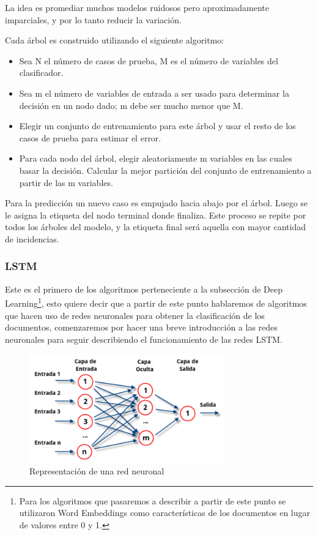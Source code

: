 La idea es promediar muchos modelos ruidosos pero aproximadamente imparciales, y por lo tanto reducir la variación.

Cada árbol es construido utilizando el siguiente algoritmo:
\begin{itemize}
	\item Sea N el número de casos de prueba, M es el número de variables del clasificador.
	\item Sea m el número de variables de entrada a ser usado para determinar la decisión en un nodo dado; m debe ser mucho menor que M.
	\item Elegir un conjunto de entrenamiento para este árbol y usar el resto de los casos de prueba para estimar el error.
	\item Para cada nodo del árbol, elegir aleatoriamente m variables en las cuales basar la decisión. Calcular la mejor partición del conjunto de entrenamiento a partir de las m variables.
\end{itemize}

Para la predicción un nuevo caso es empujado hacia abajo por el árbol. Luego se le asigna la etiqueta del nodo terminal donde finaliza. Este proceso se repite por todos los árboles del modelo, y la etiqueta final será aquella con mayor cantidad de incidencias.

\subsubsection{LSTM}\label{lstmsection}

Este es el primero de los algoritmos perteneciente a la subsección de Deep Learning\footnote{Para los algoritmos que pasaremos a describir a partir de este punto se utilizaron Word Embeddings como características de los documentos en lugar de valores entre 0 y 1.}, esto quiere decir que a partir de este punto hablaremos de algoritmos que hacen uso de redes neuronales para obtener la clasificación de los documentos, comenzaremos por hacer una breve introducción a las redes neuronales para seguir describiendo el funcionamiento de las redes LSTM.

\begin{figure}[!ht]
	\centering
	\includegraphics[width=0.75\textwidth]{imaxes/red.png}
	\caption{Representación de una red neuronal}
	\label{redneuronal}
\end{figure}

